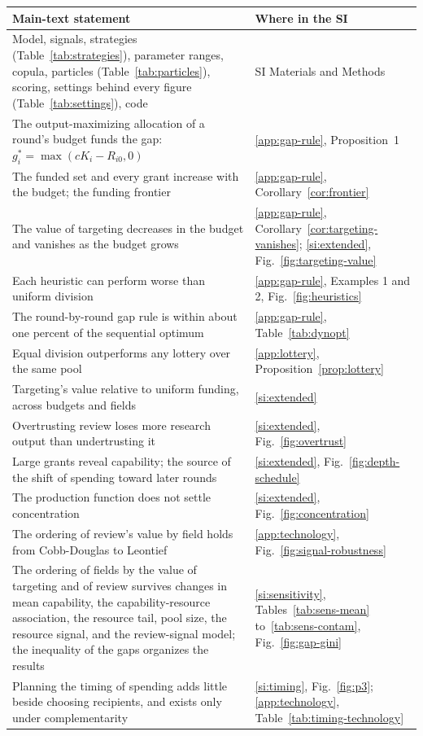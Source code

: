 \documentclass[article, 11pt, reqno]{amsart}
\theoremstyle{named}
\begin{document}
\begin{center}
\small
\begin{tabular}{@{}p{8.4cm}p{4.6cm}@{}}
\toprule
Main-text statement & Where in the SI \\
\midrule
Model, signals, strategies (Table~\ref{tab:strategies}), parameter ranges, copula, particles (Table~\ref{tab:particles}), scoring, settings behind every figure (Table~\ref{tab:settings}), code & SI Materials and Methods \\
The output-maximizing allocation of a round's budget funds the gap: $g_i^* = \max(cK_i - R_{i0}, 0)$ & \ref{app:gap-rule}, Proposition~1 \\
The funded set and every grant increase with the budget; the funding frontier & \ref{app:gap-rule}, Corollary~\ref{cor:frontier} \\
The value of targeting decreases in the budget and vanishes as the budget grows & \ref{app:gap-rule}, Corollary~\ref{cor:targeting-vanishes}; \ref{si:extended}, Fig.~\ref{fig:targeting-value} \\
Each heuristic can perform worse than uniform division & \ref{app:gap-rule}, Examples 1 and 2, Fig.~\ref{fig:heuristics} \\
The round-by-round gap rule is within about one percent of the sequential optimum & \ref{app:gap-rule}, Table~\ref{tab:dynopt} \\
Equal division outperforms any lottery over the same pool & \ref{app:lottery}, Proposition~\ref{prop:lottery} \\
Targeting's value relative to uniform funding, across budgets and fields & \ref{si:extended} \\
Overtrusting review loses more research output than undertrusting it & \ref{si:extended}, Fig.~\ref{fig:overtrust} \\
Large grants reveal capability; the source of the shift of spending toward later rounds & \ref{si:extended}, Fig.~\ref{fig:depth-schedule} \\
The production function does not settle concentration & \ref{si:extended}, Fig.~\ref{fig:concentration} \\
The ordering of review's value by field holds from Cobb-Douglas to Leontief & \ref{app:technology}, Fig.~\ref{fig:signal-robustness} \\
The ordering of fields by the value of targeting and of review survives changes in mean capability, the capability-resource association, the resource tail, pool size, the resource signal, and the review-signal model; the inequality of the gaps organizes the results & \ref{si:sensitivity}, Tables~\ref{tab:sens-mean} to~\ref{tab:sens-contam}, Fig.~\ref{fig:gap-gini} \\
Planning the timing of spending adds little beside choosing recipients, and exists only under complementarity & \ref{si:timing}, Fig.~\ref{fig:p3}; \ref{app:technology}, Table~\ref{tab:timing-technology} \\
\bottomrule
\end{tabular}
\end{center}











\end{document}
